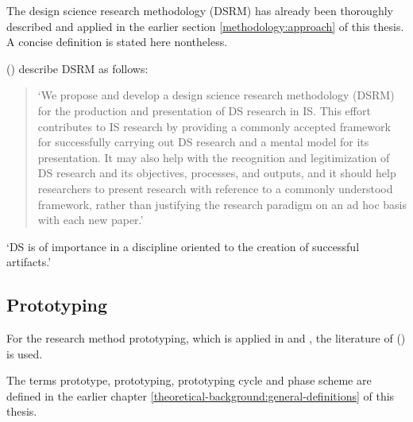 The
design science research methodology (DSRM)
has already been thoroughly described and applied in the earlier section
\ref{methodology:approach} 
of this thesis.
A concise definition is stated here nontheless.

\citeauthor{designScienceResearchMethodologyForInformationSystemsResearch} (\citeyear{designScienceResearchMethodologyForInformationSystemsResearch})
describe DSRM as follows:

\begin{quotation}
\noindent
\enquote*{We propose and develop a design science research methodology (DSRM) for the
production and presentation of DS research in IS. This effort contributes to IS research
by providing a commonly accepted framework for successfully carrying out DS research
and a mental model for its presentation. It may also help with the recognition
and legitimization of DS research and its objectives, processes, and outputs, and it
should help researchers to present research with reference to a commonly understood
framework, rather than justifying the research paradigm on an ad hoc basis with each
new paper.}
\autocite{designScienceResearchMethodologyForInformationSystemsResearch}
\end{quotation}

\enquote*{DS is of importance in a discipline oriented to the creation of successful artifacts.}
\autocite{designScienceResearchMethodologyForInformationSystemsResearch}








\subsection{Prototyping}
\label{methodology:prototyping}

For the research method prototyping,
which is applied in
and
,
the literature of \citeauthor{riedlManagementInformatik2019} (\citeyear{riedlManagementInformatik2019}) is used.

The terms prototype, prototyping, prototyping cycle and phase scheme are defined in the earlier chapter
\ref{theoretical-background:general-definitions} 
of this thesis.

